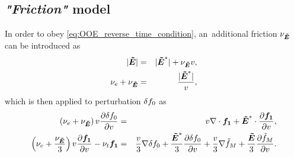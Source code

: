 \documentclass[preprint,12pt]{elsarticle}
\newcounter{bla}
\begin{document}

\subsection{\textit{"Friction"} model}
\label{sec:OOE_stable_splitting}
\newcommand{\nuE}{\nu_{\tE}}
In order to obey \eqref{eq:OOE_reverse_time_condition}, an~additional friction
$\nu_{\boldsymbol{\tilde{E}}}$ can be introduced as
\begin{eqnarray}
  |\tE| &=& |\tE^*| + \nuE \vmag  ,
  \nonumber \\
  \nue + \nuE &=& \frac{|\tE^*|}{\vmag} ,
  \nonumber
\end{eqnarray}
which is then applied to perturbation $\delta f_0$ as
\begin{eqnarray}
  \left(\nue + \nuE\right) \vmag \pdv{\dafzero}{\vmag} &=&
  \vmag\nabla\cdot\fone + \tE^*\cdot\pdv{\fone}{\vmag} , 
  \nonumber\\
  \left(\nue + \frac{\nuE}{3}\right) \vmag\pdv{\fone}{\vmag} - \nutot\fone &=& 
  \frac{\vmag}{3}\nabla\dafzero + 
  \frac{\tE^*}{3}\pdv{\dafzero}{\vmag}
  + \frac{\vmag}{3}\nabla\tfM + \frac{\tE}{3}\pdv{\tfM}{\vmag} .
  \nonumber
\end{eqnarray}
\end{document}
